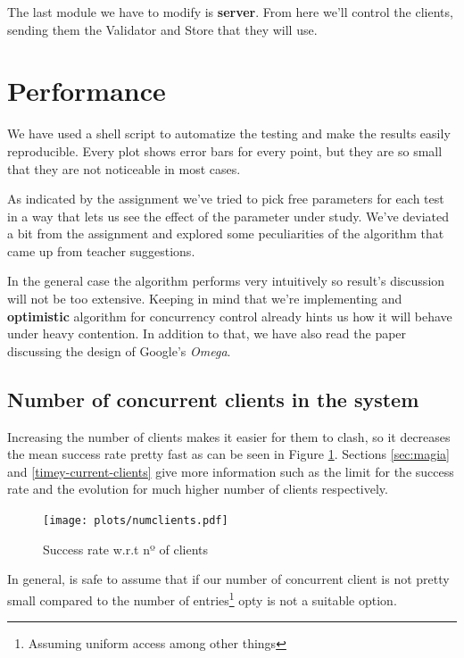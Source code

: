 \documentclass[a4paper, 10pt]{article}
\begin{document}
  The last module we have to modify is \textbf{server}. From here we'll control the clients, sending them the Validator and Store that they will use.

\clearpage
\section{Performance}

We have used a shell script to automatize the testing and make the results easily reproducible. Every plot shows error bars for every point, but they are so small that they are not noticeable in most cases.

As indicated by the assignment we've tried to pick free parameters for each test in a way that lets us see the effect of the parameter under study. We've deviated a bit from the assignment and explored some peculiarities of the algorithm that came up from teacher suggestions. 

In the general case the algorithm performs very intuitively so result's discussion will not be too extensive. Keeping in mind that we're implementing and \textbf{optimistic} algorithm for concurrency control already hints us how it will behave under heavy contention. In addition to that, we have also read the paper discussing the design of Google's \textit{Omega}.

\subsection{Number of concurrent clients in the system}
\label{sec:numclients}

Increasing the number of clients makes it easier for them to clash, so it decreases the mean success rate pretty fast as can be seen in Figure \ref{fig:numclients}. Sections \ref{sec:magia} and \ref{timey-current-clients} give more information such as the limit for the success rate and the evolution for much higher number of clients respectively.


\begin{figure}[H]
  \centering
  \texttt{[image: plots/numclients.pdf]}
    \caption{Success rate w.r.t nº of clients}
    \label{fig:numclients}
\end{figure} 

In general, is safe to assume that if our number of concurrent client is not pretty small compared to the number of entries\footnote{Assuming uniform access among other things} opty is not a suitable option.
\end{document}
